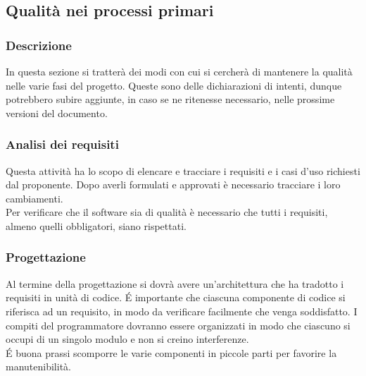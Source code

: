 \subsection{Qualità nei processi primari}
\subsubsection{Descrizione}
In questa sezione si tratterà dei modi con cui si cercherà di mantenere la qualità nelle varie fasi del progetto. Queste sono delle dichiarazioni di intenti, dunque potrebbero subire aggiunte, in caso se ne ritenesse necessario, nelle prossime versioni del documento.
\subsubsection{Analisi dei requisiti}
Questa attività ha lo scopo di elencare e tracciare i requisiti e i casi d'uso richiesti dal proponente. Dopo averli formulati e approvati è necessario tracciare i loro cambiamenti. \\
Per verificare che il software sia di qualità è necessario che tutti i requisiti, almeno quelli obbligatori, siano rispettati.		
\subsubsection{Progettazione}
Al termine della progettazione si dovrà avere un'architettura che ha tradotto i requisiti in unità di codice. \'E importante che ciascuna componente di codice si riferisca ad un requisito, in modo da verificare facilmente che venga soddisfatto. I compiti del programmatore dovranno essere organizzati in modo che ciascuno si occupi di un singolo modulo e non si creino interferenze.\\
\'E buona prassi scomporre le varie componenti in piccole parti per favorire la manutenibilità.
